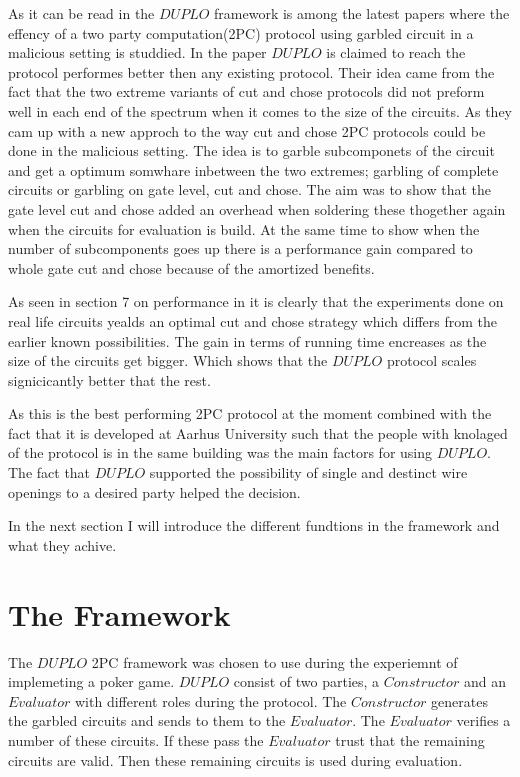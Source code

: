 \documentclass[twoside,11pt,openright]{report}
\begin{document}
As it can be read in  the $DUPLO$ framework is among the latest papers where the effency of a two party computation(2PC) protocol using garbled circuit in a malicious setting is studdied. In the paper $DUPLO$ is claimed to reach the protocol performes better then any existing protocol. Their idea came from the fact that the two extreme variants of cut and chose protocols did not preform well in each end of the spectrum when it comes to the size of the circuits. As they cam up with a new approch to the way cut and chose 2PC protocols could be done in the malicious setting. The idea is to garble subcomponets of the circuit and get a optimum somwhare inbetween the two extremes; garbling of complete circuits or garbling on gate level, cut and chose. The aim was to show that the gate level cut and chose added an overhead when soldering these thogether again when the circuits for evaluation is build. At the same time to show when the number of subcomponents goes up there is a performance gain compared to whole gate cut and chose because of the amortized benefits. 

As seen in section 7 on performance in  it is clearly that the experiments done on real life circuits yealds an optimal cut and chose strategy which differs from the earlier known possibilities. The gain in terms of running time encreases as the size of the circuits get bigger. Which shows that the $DUPLO$ protocol scales signicicantly better that the rest.

\bigskip

As this is the best performing 2PC protocol at the moment combined with the fact that it is developed at Aarhus University such that the people with knolaged of the protocol is in the same building was the main factors for using $DUPLO$. The fact that $DUPLO$ supported the possibility of single and destinct wire openings to a desired party helped the decision. 

\bigskip

In the next section I will introduce the different fundtions in the framework and what they achive.

\section{The Framework}
\label{sec:framework}
The $DUPLO$ 2PC framework was chosen to use during the experiemnt of implemeting a poker game. $DUPLO$ consist of two parties, a $Constructor$ and an $Evaluator$ with different roles during the protocol. The $Constructor$ generates the garbled circuits and sends to them to the $Evaluator$. The $Evaluator$ verifies a number of these circuits. If these pass the $Evaluator$ trust that the remaining circuits are valid. Then these remaining circuits is used during evaluation.
\end{document}
